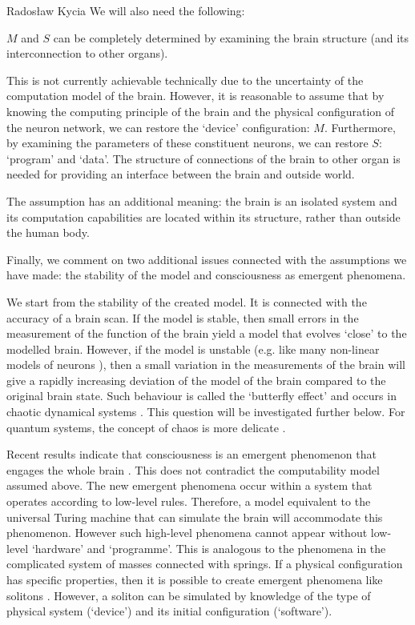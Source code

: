 \begin{artengenv}{Radosław Kycia}
We will also need the following:
\begin{Assumption}
\label{Assumption_mapping}
  $M$ and $S$ can be completely determined by examining the brain structure (and its interconnection to other organs).
\end{Assumption}
This is not currently achievable technically due to the uncertainty of the computation model of the brain. However, it is reasonable to assume that by knowing the computing principle of the brain and the physical configuration of the neuron network, we can restore the `device' configuration: $M$. Furthermore, by examining the parameters of these constituent neurons, we can restore $S$: `program' and `data'. The structure of connections of the brain to other organ is needed for providing an interface between the brain and outside world. 

The assumption has an additional meaning: the brain is an isolated system and its computation capabilities are located within its structure, rather than outside the human body.
	
Finally, we comment on two additional issues connected with the assumptions we have made: the stability of the model and consciousness as emergent phenomena.


We start from the stability of the created model. It is connected with the accuracy of a brain scan. If the model is stable, then small errors in the measurement of the function of the brain yield a model that evolves `close' to the modelled brain. However, if the model is unstable (e.g. like many non-linear models of neurons \parencite{ModellingNeurons}), then a small variation in the measurements of the brain will give a rapidly increasing deviation of the model of the brain compared to the original brain state. Such behaviour is called the `butterfly effect' and occurs in chaotic dynamical systems \parencite{ModellingNeurons, Ott}. This question will be investigated further below. For quantum systems, the concept of chaos is more delicate \parencite{Ott}.

Recent results indicate that consciousness is an emergent phenomenon that engages the whole brain \parencite{EmergentBrain}. This does not contradict the computability model assumed above. The new emergent phenomena occur within a system that operates according to low-level rules. Therefore, a model equivalent to the universal Turing machine that can simulate the brain will accommodate this phenomenon. However such high-level phenomena cannot appear without low-level `hardware' and `programme'. This is analogous to the phenomena in the complicated system of masses connected with springs. If a physical configuration has specific properties, then it is possible to create emergent phenomena like solitons \parencite{Ott}. However, a soliton can be simulated by knowledge of the type of physical system (`device') and its initial configuration (`software').



\end{artengenv}
